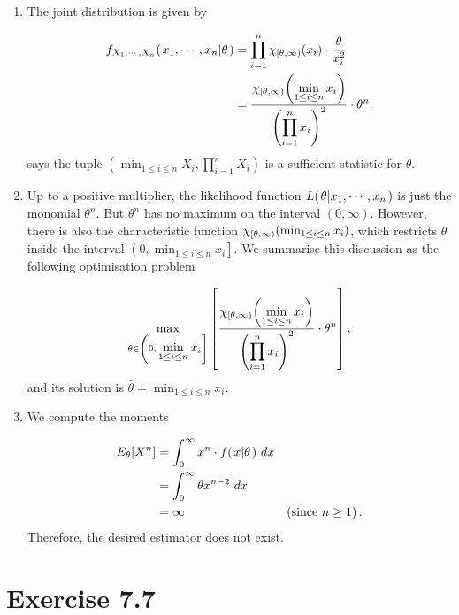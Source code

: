 \documentclass[12pt,letterpaper,reqno]{amsart}
\numberwithin{equation}{subsection}
\begin{document}
\begin{enumerate}[label=(\alph*), leftmargin=*]
    \item The joint distribution is given by
    
    \begin{align*}
        \fun{f_{X_1, \cdots, X_n}}{\conditbar{x_1, \cdots, x_n}{\theta}} &= \prod_{i=1}^n \fun{\chi_{\left[ \theta, \infty \right)}}{x_i} \cdot \frac{\theta}{x_i^2} \\
        &= \frac{\fun{\chi_{\left[ \theta, \infty \right)}}{\displaystyle \min_{1 \leq i \leq n} x_i}}{\displaystyle \left( \prod_{i=1}^n x_i \right)^2} \cdot \theta^n.
    \end{align*}
\cite[Factorization Theorem 6.2.6 on page 276]{Berger-Casella} says the tuple $\left( \min_{1 \leq i \leq n} X_i, \prod_{i=1}^n X_i \right)$ is a sufficient statistic for $\theta$.

\item Up to a positive multiplier, the likelihood function $\fun{L}{\conditbar{\theta}{x_1, \cdots, x_n}}$ is just the monomial $\theta^n$. But $\theta^n$ has no maximum on the interval $\left( 0, \infty \right)$. However, there is also the characteristic function $\fun{\chi_{\left[ \theta, \infty \right)}}{\min_{1 \leq i \leq n} x_i}$, which restricts $\theta$ inside the interval $\left( 0, \min_{1 \leq i \leq n} x_i \right]$. We summarise this discussion as the following optimisation problem

\[ \max_{\theta \in \left( 0, \displaystyle \min_{1 \leq i \leq n} x_i \right]} \left[ \frac{\fun{\chi_{\left[ \theta, \infty \right)}}{\displaystyle \min_{1 \leq i \leq n} x_i}}{\displaystyle \left( \prod_{i=1}^n x_i \right)^2} \cdot \theta^n \right], \]
and its solution is $\hat{\theta} = \min_{1 \leq i \leq n} x_i$.

\item We compute the moments

\begin{align*}
    \funbracket{E_{\theta}}{X^n} &= \myint{x^n \cdot \fun{f}{\conditbar{x}{\theta}}}{x}{0}{\infty} \\
    &= \myint{\theta x^{n-2}}{x}{0}{\infty} \\
    &= \infty & \left( \mbox{since $n \geq 1$} \right).
\end{align*}
Therefore, the desired estimator does not exist.
\end{enumerate}

\newpage
\section{Exercise 7.7}
\end{document}
